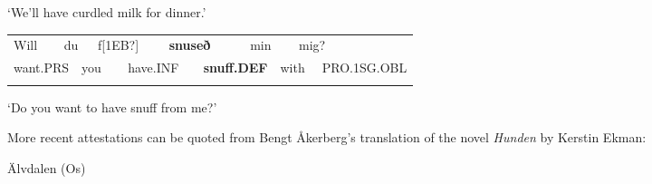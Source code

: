 
\begin{styleTranslation}
‘We’ll have curdled milk for dinner.’

\end{styleTranslation}


\begin{tabular}{llllllllllll}
\lsptoprule
Will & \multicolumn{2}{l}{du

} & \multicolumn{2}{l}{f[1EB?]

} & \multicolumn{2}{l}{{\bfseries snuseð}

} & \multicolumn{2}{l}{min

} & \multicolumn{2}{l}{mig?

} & \\
\multicolumn{2}{l}{want.PRS

} & \multicolumn{2}{l}{you

} & \multicolumn{2}{l}{have.INF

} & \multicolumn{2}{l}{{\bfseries snuff.DEF}

} & \multicolumn{2}{l}{with

} & \multicolumn{2}{l}{PRO.1SG.OBL

}\\
\lspbottomrule
\end{tabular}

\begin{styleTranslation}
 ‘Do you want to have snuff from me?’

\end{styleTranslation}

\begin{styleBodyTextFirst}
More recent attestations can be quoted from Bengt Åkerberg’s translation of the novel \textit{Hunden} by Kerstin Ekman:

\end{styleBodyTextFirst}


\begin{listWWNumileveli}
\item {}

\begin{styleExample}
\label{bkm:Ref113183734}Älvdalen (Os) 

\end{styleExample}

\end{listWWNumileveli}

